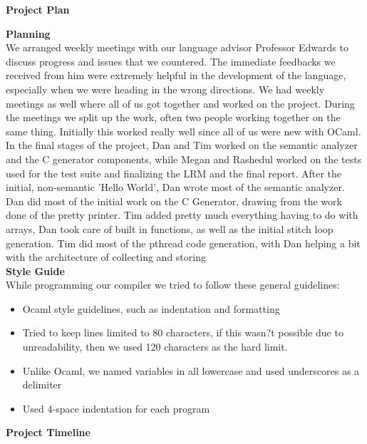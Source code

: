 \documentclass[11pt, oneside]{article}   	%
\newcommand{\tab} {\hspace*{2em}}
\begin{document}
\newpage
\tab
\newpage
\tab
\newpage
\tab
\newpage
\tab
\newpage
\tab
\newpage
\tab
\newpage
\tab
\newpage
\tab
\newpage
\tab
\newpage
\tab
\newpage
\tab
\newpage
\tab
\newpage
\tab
\newpage

\LARGE\textbf{Project Plan}\\[2em]
\normalsize

\Large\textbf{Planning}\\[1em]
\normalsize
We arranged weekly meetings with our language advisor Professor Edwards to discuss progress and issues that we countered. The immediate feedbacks we received from him were extremely helpful in the development of the language, especially when we were heading in the wrong directions. We had weekly meetings as well where all of us got together and worked on the project. During the meetings we split up the work, often two people working together on the same thing. Initially this worked really well since all of us were new with OCaml. \\
In the final stages of the project, Dan and Tim worked on the semantic analyzer and the C generator components, while Megan and Rashedul worked on the tests used for the test suite and finalizing the LRM and the final report.  After the initial, non-semantic 'Hello World', Dan wrote most of the semantic analyzer.  Dan did most of the initial work on the C Generator, drawing from the work done of the pretty printer.  Tim added pretty much everything having to do with arrays, Dan took care of built in functions, as well as the initial stitch loop generation.  Tim did most of the pthread code generation, with Dan helping a bit with the architecture of collecting and storing \\[3em]
\Large\textbf{Style Guide}\\[1em]
\normalsize
While programming our compiler we tried to follow these general guidelines:
\begin{itemize}
  \item Ocaml style guidelines, such as indentation and formatting
  \item Tried to keep lines limited to 80 characters, if this wasn?t possible due to unreadability, then we used 120 characters as the hard limit.
  \item Unlike Ocaml, we named variables in all lowercase and used underscores as a delimiter
  \item Used 4-space indentation for each program 
\end{itemize}
\newpage
\Large\textbf{Project Timeline}\\[0em]
\end{document}
